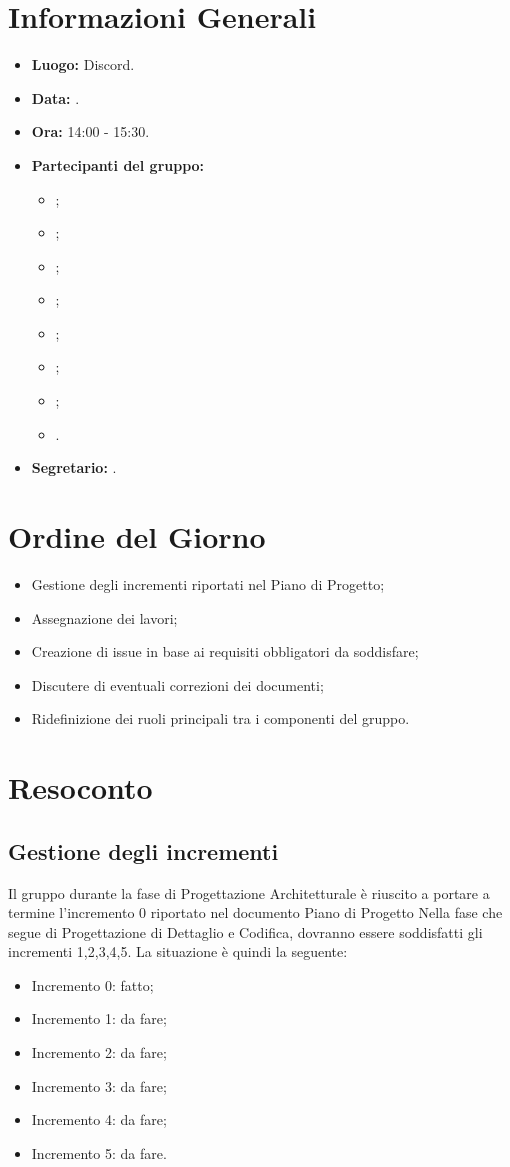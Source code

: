 \section{Informazioni Generali}
\begin{itemize}
\item \textbf{Luogo:} Discord.
\item \textbf{Data:} \Data.
\item \textbf{Ora:} 14:00 - 15:30.
\item \textbf{Partecipanti del gruppo:}
	\begin{itemize}
		\item \AT{}; 
		\item \BR{};
		\item \CE{}; 
		\item \DF{};
		\item \LD{};
		\item \MC{};
		\item \PF{};
		\item \SE{}.
	\end{itemize} 
\item \textbf{Segretario:} \SE{}.
\end{itemize}

\section{Ordine del Giorno}
\begin{itemize}
	\item Gestione degli incrementi riportati nel Piano di Progetto;
	\item Assegnazione dei lavori;
	\item Creazione di issue in base ai requisiti obbligatori da soddisfare;
	\item Discutere di eventuali correzioni dei documenti;
	\item Ridefinizione dei ruoli principali tra i componenti del gruppo.
\end{itemize}


\section{Resoconto}

\subsection{Gestione degli incrementi}
Il gruppo durante la fase di Progettazione Architetturale è riuscito a portare a termine l'incremento 0 riportato nel documento Piano di Progetto
Nella fase che segue di Progettazione di Dettaglio e Codifica, dovranno essere soddisfatti gli incrementi 1,2,3,4,5.
La situazione è quindi la seguente:
\begin{itemize}
	\item Incremento 0: fatto;
	\item Incremento 1: da fare;
	\item Incremento 2: da fare;
	\item Incremento 3: da fare;
	\item Incremento 4: da fare;
	\item Incremento 5: da fare.
\end{itemize}


